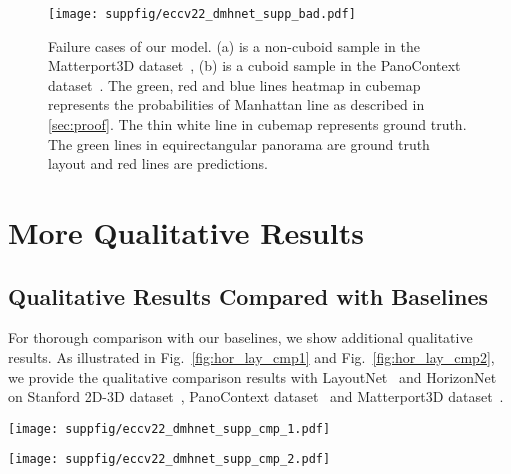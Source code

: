 \documentclass[runningheads]{llncs}
\begin{document}
\begin{figure}[!h]
\centering
\texttt{[image: suppfig/eccv22\_dmhnet\_supp\_bad.pdf]}
\label{fig:bad_case}
\caption{Failure cases of our model. (a) is a non-cuboid sample in the Matterport3D dataset~\cite{Matterport3D}, (b) is a cuboid sample in the PanoContext dataset~\cite{zhang2014panocontext}. The green, red and blue lines heatmap in cubemap represents the probabilities of Manhattan line as described in \cref{sec:proof}. 
The thin white line in cubemap represents ground truth.
The green lines in equirectangular panorama are ground truth layout and red lines are predictions.}
\label{fig:bad_case}
\end{figure}







\section{More Qualitative Results}
\subsection{Qualitative Results Compared with Baselines}
For thorough comparison with our baselines, we show additional qualitative results.
As illustrated in Fig.~\ref{fig:hor_lay_cmp1} and Fig.~\ref{fig:hor_lay_cmp2}, we provide the qualitative comparison results with LayoutNet~\cite{zou2018layoutnet,zou2021_layoutv2} and HorizonNet~\cite{sun2019horizonnet} on Stanford 2D-3D dataset~\cite{armeni2017joint}, PanoContext dataset~\cite{zhang2014panocontext} and Matterport3D dataset~\cite{Matterport3D}.

\begin{figure*}[!h]
	\centering
	\vspace{-0.5cm}
	\texttt{[image: suppfig/eccv22\_dmhnet\_supp\_cmp\_1.pdf]}
	\vspace{-1ex}
	\caption{More qualitative results of both cuboid and non-cuboid layout estimation~(1). The green lines are ground truth layout while the pink, blue and red lines are estimated by LayoutNet~\cite{zou2018layoutnet}, HorizonNet~\cite{sun2019horizonnet} and our DMH-Net.}
\label{fig:hor_lay_cmp1} 
\end{figure*}


\begin{figure*}[!h]
	\centering
	\vspace{-0.5cm}
	\texttt{[image: suppfig/eccv22\_dmhnet\_supp\_cmp\_2.pdf]}
	\vspace{-1ex}
	\caption{More qualitative results of both cuboid and non-cuboid layout estimation~(2). The green lines are ground truth layout while the pink, blue and red lines are estimated by LayoutNet~\cite{zou2018layoutnet}, HorizonNet~\cite{sun2019horizonnet} and our DMH-Net.}
\label{fig:hor_lay_cmp2} 
\end{figure*}
\end{document}
